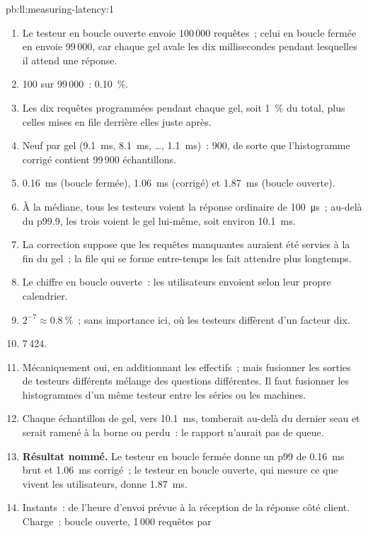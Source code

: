 \begin{solution}{pb:ll:measuring-latency:1}
\begin{enumerate}
\item Le testeur en boucle ouverte envoie 100\,000 requêtes~; celui en boucle fermée en envoie 99\,000, car chaque gel avale les dix
millisecondes pendant lesquelles il attend une réponse.
\item 100 sur 99\,000~: 0.10~\%.
\item Les dix requêtes programmées pendant chaque gel, soit 1~\% du total, plus celles mises en file derrière elles juste après.
\item Neuf par gel (\qty{9.1}{\milli\second}, \qty{8.1}{\milli\second}, \dots, \qty{1.1}{\milli\second})~: 900, de sorte que l'histogramme corrigé contient
99\,900 échantillons.
\item \qty{0.16}{\milli\second} (boucle fermée), \qty{1.06}{\milli\second} (corrigé) et \qty{1.87}{\milli\second} (boucle
ouverte).
\item À la médiane, tous les testeurs voient la réponse ordinaire de \qty{100}{\micro\second}~; au-delà du p99.9, les trois voient le gel
lui-même, soit environ \qty{10.1}{\milli\second}.
\item La correction suppose que les requêtes manquantes auraient été servies à la fin du gel~; la file qui
se forme entre-temps les fait attendre plus longtemps.
\item Le chiffre en boucle ouverte~: les utilisateurs envoient selon leur propre calendrier.
\item $2^{-7} \approx 0.8~\%$~; sans importance ici, où les testeurs diffèrent d'un facteur dix.
\item 7\,424.
\item Mécaniquement oui, en additionnant les effectifs~; mais fusionner les sorties de testeurs différents mélange des questions différentes. Il faut
fusionner les histogrammes d'un même testeur entre les séries ou les machines.
\item Chaque échantillon de gel, vers \qty{10.1}{\milli\second}, tomberait au-delà du dernier seau et serait ramené à la borne ou perdu~:
le rapport n'aurait pas de queue.
\item \textbf{Résultat nommé.} Le testeur en boucle fermée donne un p99 de \qty{0.16}{\milli\second} brut et
\qty{1.06}{\milli\second} corrigé~; le testeur en boucle ouverte, qui mesure ce que vivent les utilisateurs, donne \qty{1.87}{\milli\second}.
\item Instants~: de l'heure d'envoi prévue à la réception de la réponse côté client. Charge~: boucle ouverte, 1\,000 requêtes par

\end{enumerate}
\end{solution}
